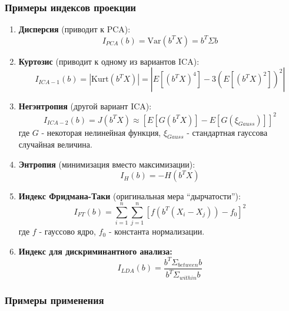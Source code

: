 \documentclass[a4paper,12pt]{article}
\begin{document}
\subsubsection{Примеры индексов проекции}

\begin{enumerate}
    \item \textbf{Дисперсия} (приводит к PCA):
   $$I_{PCA}(b) = \text{Var}(b^T X) = b^T \Sigma b$$

    \item \textbf{Куртозис} (приводит к одному из вариантов ICA):
   $$I_{ICA-1}(b) = |\text{Kurt}(b^T X)| = |E[(b^T X)^4] - 3(E[(b^T X)^2])^2|$$

    \item \textbf{Негэнтропия} (другой вариант ICA):
   $$I_{ICA-2}(b) = J(b^T X) \approx [E[G(b^T X)] - E[G(\xi_{Gauss})]]^2$$
   где $G$ - некоторая нелинейная функция, $\xi_{Gauss}$ - стандартная гауссова случайная величина.

    \item \textbf{Энтропия} (минимизация вместо максимизации):
   $$I_H(b) = -H(b^T X)$$

    \item \textbf{Индекс Фридмана-Таки} (оригинальная мера ``дырчатости''):
   $$I_{FT}(b) = \sum_{i=1}^n\sum_{j=1}^n [f(b^T (X_i - X_j)) - f_0]^2$$
   где $f$ - гауссово ядро, $f_0$ - константа нормализации.

    \item \textbf{Индекс для дискриминантного анализа:}
   $$I_{LDA}(b) = \frac{b^T \Sigma_{between} b}{b^T \Sigma_{within} b}$$
\end{enumerate}

\subsubsection{Примеры применения}
\end{document}
